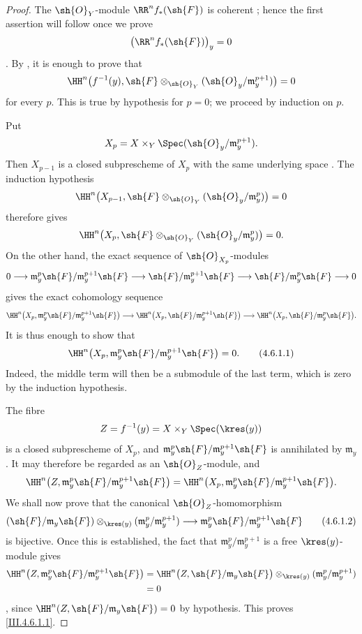 \begin{proof}
The $\sh{O}_Y$-module $\RR^n f_*(\sh{F})$ is coherent
; hence the first assertion will follow once we prove
\[
  \bigl(\RR^n f_*(\sh{F})\bigr)_y=0
\]
.  By , it is enough to prove that
\[
  \HH^n\bigl(f^{-1}(y),
    \sh{F}\otimes_{\sh{O}_Y}
      (\sh{O}_y/\mathfrak m_y^{p+1})\bigr)=0
\]
for every $p$.  This is true by hypothesis for $p=0$; we proceed by
induction on $p$.

Put
\[
  X_p=X\times_Y
    \Spec(\sh{O}_y/\mathfrak m_y^{p+1}).
\]
Then $X_{p-1}$ is a closed subprescheme of $X_p$ with the same
underlying space .  The induction hypothesis
\[
  \HH^n\bigl(X_{p-1},
    \sh{F}\otimes_{\sh{O}_Y}
      (\sh{O}_y/\mathfrak m_y^p)\bigr)=0
\]
therefore gives
\[
  \HH^n\bigl(X_p,
    \sh{F}\otimes_{\sh{O}_Y}
      (\sh{O}_y/\mathfrak m_y^p)\bigr)=0.
\]
On the other hand, the exact sequence of $\sh{O}_{X_p}$-modules
\[
  0\longrightarrow
  \mathfrak m_y^p\sh{F}/\mathfrak m_y^{p+1}\sh{F}
  \longrightarrow
  \sh{F}/\mathfrak m_y^{p+1}\sh{F}
  \longrightarrow
  \sh{F}/\mathfrak m_y^p\sh{F}
  \longrightarrow0
\]
gives the exact cohomology sequence
\[
  \HH^n\bigl(X_p,
    \mathfrak m_y^p\sh{F}/\mathfrak m_y^{p+1}\sh{F}\bigr)
  \longrightarrow
  \HH^n\bigl(X_p,\sh{F}/\mathfrak m_y^{p+1}\sh{F}\bigr)
  \longrightarrow
  \HH^n\bigl(X_p,\sh{F}/\mathfrak m_y^p\sh{F}\bigr).
\]
It is thus enough to show that
\[
\label{III.4.6.1.1}
  \HH^n\bigl(X_p,
    \mathfrak m_y^p\sh{F}/\mathfrak m_y^{p+1}\sh{F}\bigr)=0.
  \tag{4.6.1.1}
\]
Indeed, the middle term will then be a submodule of the last term,
which is zero by the induction hypothesis.


The fibre
\[
  Z=f^{-1}(y)=X\times_Y\Spec(\kres(y))
\]
is a closed subprescheme of $X_p$, and
$\mathfrak m_y^p\sh{F}/\mathfrak m_y^{p+1}\sh{F}$ is annihilated by
$\mathfrak m_y$.  It may therefore be regarded as an
$\sh{O}_Z$-module, and
\[
  \HH^n\bigl(Z,
    \mathfrak m_y^p\sh{F}/\mathfrak m_y^{p+1}\sh{F}\bigr)
  =
  \HH^n\bigl(X_p,
    \mathfrak m_y^p\sh{F}/\mathfrak m_y^{p+1}\sh{F}\bigr).
\]
We shall now prove that the canonical $\sh{O}_Z$-homomorphism
\[
\label{III.4.6.1.2}
  (\sh{F}/\mathfrak m_y\sh{F})
    \otimes_{\kres(y)}
      (\mathfrak m_y^p/\mathfrak m_y^{p+1})
  \longrightarrow
  \mathfrak m_y^p\sh{F}/\mathfrak m_y^{p+1}\sh{F}
  \tag{4.6.1.2}
\]
is bijective.  Once this is established, the fact that
$\mathfrak m_y^p/\mathfrak m_y^{p+1}$ is a free
$\kres(y)$-module gives
\[
\begin{split}
  \HH^n\bigl(Z,
    \mathfrak m_y^p\sh{F}/\mathfrak m_y^{p+1}\sh{F}\bigr)
  &=
  \HH^n\bigl(Z,\sh{F}/\mathfrak m_y\sh{F}\bigr)
    \otimes_{\kres(y)}
      (\mathfrak m_y^p/\mathfrak m_y^{p+1})\\
  &=0
\end{split}
\]
, since
$\HH^n(Z,\sh{F}/\mathfrak m_y\sh{F})=0$ by hypothesis.  This proves
\eqref{III.4.6.1.1}.


\end{proof}
